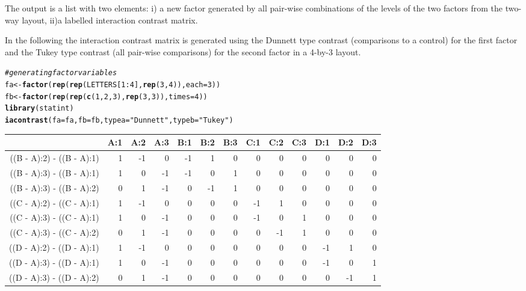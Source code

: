 \documentclass[12pt]{article}\usepackage[]{graphicx}\usepackage[]{color}
\makeatletter
\newcommand{\hlnum}[1]{\textcolor[rgb]{0.686,0.059,0.569}{#1}}%
\newcommand{\hlstr}[1]{\textcolor[rgb]{0.192,0.494,0.8}{#1}}%
\newcommand{\hlcom}[1]{\textcolor[rgb]{0.678,0.584,0.686}{\textit{#1}}}%
\newcommand{\hlopt}[1]{\textcolor[rgb]{0,0,0}{#1}}%
\newcommand{\hlstd}[1]{\textcolor[rgb]{0.345,0.345,0.345}{#1}}%
\newcommand{\hlkwb}[1]{\textcolor[rgb]{0.69,0.353,0.396}{#1}}%
\newcommand{\hlkwc}[1]{\textcolor[rgb]{0.333,0.667,0.333}{#1}}%
\newcommand{\hlkwd}[1]{\textcolor[rgb]{0.737,0.353,0.396}{\textbf{#1}}}%
\newenvironment{kframe}{%
 \def\at@end@of@kframe{}%
 \ifinner\ifhmode%
  \def\at@end@of@kframe{\end{minipage}}%
  \begin{minipage}{\columnwidth}%
 \fi\fi%
 \def\FrameCommand##1{\hskip\@totalleftmargin \hskip-\fboxsep
 \colorbox{shadecolor}{##1}\hskip-\fboxsep
     \hskip-\linewidth \hskip-\@totalleftmargin \hskip\columnwidth}%
 \MakeFramed {\advance\hsize-\width
   \@totalleftmargin\z@ \linewidth\hsize
   \@setminipage}}%
 {\par\unskip\endMakeFramed%
 \at@end@of@kframe}
\newenvironment{knitrout}{}{} %
\makeatother
\begin{document}
The output is a list with two elements: i) \verb@fab@ a new factor generated by all pair-wise combinations of the levels of the two factors from the two-way layout, ii)\verb@cmab@ a labelled interaction contrast matrix.


In the following the interaction contrast matrix is generated using the Dunnett type contrast (comparisons to a control) for the first factor and the Tukey type contrast (all pair-wise comparisons) for the second factor in a 4-by-3 layout.
\begin{knitrout}
\color{fgcolor}\begin{kframe}
\begin{alltt}
\hlcom{# generating factor variables}
\hlstd{fa} \hlkwb{<-} \hlkwd{factor}\hlstd{(}\hlkwd{rep}\hlstd{(}\hlkwd{rep}\hlstd{(LETTERS[}\hlnum{1}\hlopt{:}\hlnum{4}\hlstd{],} \hlkwd{rep}\hlstd{(}\hlnum{3}\hlstd{,} \hlnum{4}\hlstd{)),} \hlkwc{each} \hlstd{=} \hlnum{3}\hlstd{))}
\hlstd{fb} \hlkwb{<-} \hlkwd{factor}\hlstd{(}\hlkwd{rep}\hlstd{(}\hlkwd{rep}\hlstd{(}\hlkwd{c}\hlstd{(}\hlnum{1}\hlstd{,} \hlnum{2}\hlstd{,} \hlnum{3}\hlstd{),} \hlkwd{rep}\hlstd{(}\hlnum{3}\hlstd{,} \hlnum{3}\hlstd{)),} \hlkwc{times} \hlstd{=} \hlnum{4}\hlstd{))}
\hlkwd{library}\hlstd{(statint)}
\hlkwd{iacontrast}\hlstd{(}\hlkwc{fa} \hlstd{= fa,} \hlkwc{fb} \hlstd{= fb,} \hlkwc{typea} \hlstd{=} \hlstr{"Dunnett"}\hlstd{,} \hlkwc{typeb} \hlstd{=} \hlstr{"Tukey"}\hlstd{)}
\end{alltt}
\end{kframe}
\end{knitrout}

\begin{table}[ht]
\centering
{\scriptsize
\begin{tabular}{rrrrrrrrrrrrr}
  \hline
 & A:1 & A:2 & A:3 & B:1 & B:2 & B:3 & C:1 & C:2 & C:3 & D:1 & D:2 & D:3 \\ 
  \hline
((B - A):2) - ((B - A):1) & 1 & -1 & 0 & -1 & 1 & 0 & 0 & 0 & 0 & 0 & 0 & 0 \\ 
  ((B - A):3) - ((B - A):1) & 1 & 0 & -1 & -1 & 0 & 1 & 0 & 0 & 0 & 0 & 0 & 0 \\ 
  ((B - A):3) - ((B - A):2) & 0 & 1 & -1 & 0 & -1 & 1 & 0 & 0 & 0 & 0 & 0 & 0 \\ 
  ((C - A):2) - ((C - A):1) & 1 & -1 & 0 & 0 & 0 & 0 & -1 & 1 & 0 & 0 & 0 & 0 \\ 
  ((C - A):3) - ((C - A):1) & 1 & 0 & -1 & 0 & 0 & 0 & -1 & 0 & 1 & 0 & 0 & 0 \\ 
  ((C - A):3) - ((C - A):2) & 0 & 1 & -1 & 0 & 0 & 0 & 0 & -1 & 1 & 0 & 0 & 0 \\ 
  ((D - A):2) - ((D - A):1) & 1 & -1 & 0 & 0 & 0 & 0 & 0 & 0 & 0 & -1 & 1 & 0 \\ 
  ((D - A):3) - ((D - A):1) & 1 & 0 & -1 & 0 & 0 & 0 & 0 & 0 & 0 & -1 & 0 & 1 \\ 
  ((D - A):3) - ((D - A):2) & 0 & 1 & -1 & 0 & 0 & 0 & 0 & 0 & 0 & 0 & -1 & 1 \\ 
   \hline
\end{tabular}
}
\end{table}
\end{document}
